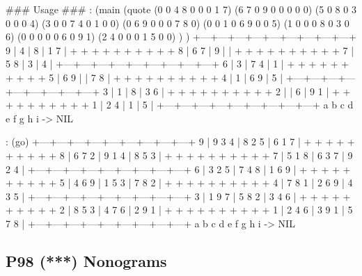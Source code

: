 \begin{wideverbatim}

### Usage ###
: (main
   (quote
      (0 0 4 8 0 0 0 1 7)
      (6 7 0 9 0 0 0 0 0)
      (5 0 8 0 3 0 0 0 4)
      (3 0 0 7 4 0 1 0 0)
      (0 6 9 0 0 0 7 8 0)
      (0 0 1 0 6 9 0 0 5)
      (1 0 0 0 8 0 3 0 6)
      (0 0 0 0 0 6 0 9 1)
      (2 4 0 0 0 1 5 0 0) ) )
   +---+---+---+---+---+---+---+---+---+
 9 |         4 | 8         |     1   7 |
   +   +   +   +   +   +   +   +   +   +
 8 | 6   7     | 9         |           |
   +   +   +   +   +   +   +   +   +   +
 7 | 5       8 |     3     |         4 |
   +---+---+---+---+---+---+---+---+---+
 6 | 3         | 7   4     | 1         |
   +   +   +   +   +   +   +   +   +   +
 5 |     6   9 |           | 7   8     |
   +   +   +   +   +   +   +   +   +   +
 4 |         1 |     6   9 |         5 |
   +---+---+---+---+---+---+---+---+---+
 3 | 1         |     8     | 3       6 |
   +   +   +   +   +   +   +   +   +   +
 2 |           |         6 |     9   1 |
   +   +   +   +   +   +   +   +   +   +
 1 | 2   4     |         1 | 5         |
   +---+---+---+---+---+---+---+---+---+
     a   b   c   d   e   f   g   h   i
-> NIL


\end{wideverbatim}

\begin{wideverbatim}


: (go)
   +---+---+---+---+---+---+---+---+---+
 9 | 9   3   4 | 8   2   5 | 6   1   7 |
   +   +   +   +   +   +   +   +   +   +
 8 | 6   7   2 | 9   1   4 | 8   5   3 |
   +   +   +   +   +   +   +   +   +   +
 7 | 5   1   8 | 6   3   7 | 9   2   4 |
   +---+---+---+---+---+---+---+---+---+
 6 | 3   2   5 | 7   4   8 | 1   6   9 |
   +   +   +   +   +   +   +   +   +   +
 5 | 4   6   9 | 1   5   3 | 7   8   2 |
   +   +   +   +   +   +   +   +   +   +
 4 | 7   8   1 | 2   6   9 | 4   3   5 |
   +---+---+---+---+---+---+---+---+---+
 3 | 1   9   7 | 5   8   2 | 3   4   6 |
   +   +   +   +   +   +   +   +   +   +
 2 | 8   5   3 | 4   7   6 | 2   9   1 |
   +   +   +   +   +   +   +   +   +   +
 1 | 2   4   6 | 3   9   1 | 5   7   8 |
   +---+---+---+---+---+---+---+---+---+
     a   b   c   d   e   f   g   h   i
-> NIL

\end{wideverbatim}

\pagebreak{}
\subsection*{{P98} (***) Nonograms}
\label{sec:99-problems-P98}

